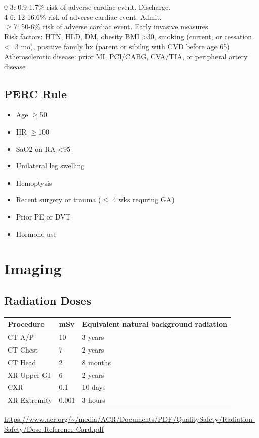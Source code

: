 \documentclass[8pt]{extarticle}
\begin{document}
0-3: 0.9-1.7\% risk of adverse cardiac event. Discharge.\\
4-6: 12-16.6\% risk of adverse cardiac event. Admit.\\
$\geq$7: 50-6\% risk of adverse cardiac event. Early invasive measures.\\

\tiny{Risk factors: HTN, HLD, DM, obesity BMI >30, smoking (current, or cessation <=3 mo), positive family hx (parent or sibilng with CVD before age 65)}\\
\tiny{Atherosclerotic disease: prior MI, PCI/CABG, CVA/TIA, or peripheral artery disease}

\subsection{PERC Rule}
    \begin{itemize}
        \item Age $\geq$50
        \item HR $\geq$100
        \item SaO2 on RA <95%
        \item Unilateral leg swelling
        \item Hemoptysis
        \item Recent surgery or trauma ($\leq$ 4 wks requring GA)
        \item Prior PE or DVT
        \item Hormone use
    \end{itemize}


\section{Imaging}
\subsection{Radiation Doses}

\begin{tabularx}{\linewidth}{|X|X|X|}
\hline
\textbf{Procedure} & \textbf{mSv} & \textbf{Equivalent natural background radiation} \\
\hline
CT A/P & 10 & 3 years  \\
\hline
CT Chest & 7 & 2 years  \\
\hline
CT Head & 2 & 8 months  \\
\hline
XR Upper GI & 6 & 2 years  \\
\hline
CXR & 0.1 & 10 days  \\
\hline
XR Extremity & 0.001 & 3 hours  \\
\hline
\end{tabularx}
\url{https://www.acr.org/~/media/ACR/Documents/PDF/QualitySafety/Radiation-Safety/Dose-Reference-Card.pdf}
\end{document}

